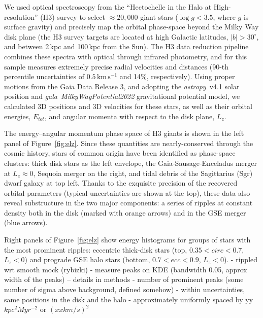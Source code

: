 \documentclass{natureprintstyle}
\newcommand{\kms}{\ensuremath{\textrm{km}\,\textrm{s}^{-1}}}
\newcommand{\package}[1]{\textsl{#1}}
\begin{document}
We used optical spectroscopy from the ``Hectochelle in the Halo at High-resolution'' (H3) survey\cite{conroy:2019} to select $\approx20,000$ giant stars ($\log g<3.5$, where $g$ is surface gravity) and precisely map the orbital phase-space beyond the Milky Way disk plane (the H3 survey targets are located at high Galactic latitudes, $|b|>30^\circ$, and between 2\,kpc and 100\,kpc from the Sun).
The H3 data reduction pipeline\cite{cargile:2020} combines these spectra with optical through infrared photometry, and for this sample measures extremely precise radial velocities and distances (90-th percentile uncertainties of $0.5\,\kms$ and 14\%, respectively).
Using proper motions from the Gaia Data Release 3\cite{gaiaedr3}, and adopting the \package{astropy}~v4.1 solar position\cite{astropy:2022} and \package{gala}~\package{MilkyWayPotential2022} gravitational potential model\cite{gala}, we calculated 3D positions and 3D velocities for these stars, as well as their orbital energies, $E_{tot}$, and angular momenta with respect to the disk plane, $L_z$.

The energy--angular momentum phase space of H3 giants is shown in the left panel of Figure~\ref{fig:elz}.
Since these quantities are nearly-conserved through the cosmic history, stars of common origin have been identified as phase-space clusters: thick disk stars as the left envelope, the Gaia-Sausage-Enceladus merger\cite{belokurov:2018,helmi:2018} at $L_z\approx0$, Sequoia merger\cite{myeong:2019,naidu:2020} on the right, and tidal debris of the Sagittarius (Sgr) dwarf galaxy\cite{ibata:2001,johnson:2020} at top left.
Thanks to the exquisite precision of the recovered orbital parameters (typical uncertainties are shown at the top), these data also reveal substructure in the two major components: a series of ripples at constant density both in the disk (marked with orange arrows) and in the GSE merger (blue arrows).

Right panels of Figure~\ref{fig:elz} show energy histograms for groups of stars with the most prominent ripples: eccentric thick-disk stars (top, $0.35<circ<0.7$, $L_z<0$) and prograde GSE halo stars (bottom, $0.7<ecc<0.9$, $L_z<0$).
- rippled wrt smooth mock (rybizki)
- measure peaks on KDE (bandwidth 0.05, approx width of the peaks) -- details in methods
- number of prominent peaks (some number of sigma above background, defined somehow)
- within uncertainties, same positions in the disk and the halo
- approximately uniformly spaced by yy $kpc^2 Myr^{-2}$ or $(xx km/s)^2$
\end{document}
